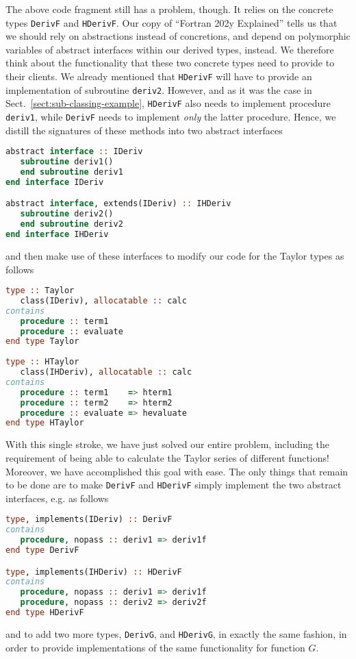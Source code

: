 \documentclass[11pt,oneside]{article}
\begin{document}
The above code fragment still has a problem, though. It relies on the
concrete types \texttt{DerivF} and \texttt{HDerivF}. Our copy of
``Fortran 202y Explained'' tells us that we should rely on
abstractions instead of concretions, and depend on polymorphic
variables of abstract interfaces within our derived types, instead. We
therefore think about the functionality that these two concrete types
need to provide to their clients. We already mentioned that
\texttt{HDerivF} will have to provide an implementation of subroutine
\texttt{deriv2}. However, and as it was the case in
Sect.~\ref{sect:sub-classing-example}, \texttt{HDerivF} also needs to
implement procedure \texttt{deriv1}, while \texttt{DerivF} needs to
implement \emph{only} the latter procedure. Hence, we distill the
signatures of these methods into two abstract interfaces
\begin{lstlisting}[language=Fortran]
abstract interface :: IDeriv
   subroutine deriv1()
   end subroutine deriv1
end interface IDeriv

abstract interface, extends(IDeriv) :: IHDeriv
   subroutine deriv2()
   end subroutine deriv2
end interface IHDeriv
\end{lstlisting}
and then make use of these interfaces to modify our code for the
Taylor types as follows
\begin{lstlisting}[language=Fortran]
type :: Taylor
   class(IDeriv), allocatable :: calc
contains
   procedure :: term1
   procedure :: evaluate
end type Taylor
   
type :: HTaylor
   class(IHDeriv), allocatable :: calc
contains
   procedure :: term1    => hterm1
   procedure :: term2    => hterm2
   procedure :: evaluate => hevaluate
end type HTaylor
\end{lstlisting}
With this single stroke, we have just solved our entire problem,
including the requirement of being able to calculate the Taylor series
of different functions! Moreover, we have accomplished this goal with
ease. The only things that remain to be done are to make
\texttt{DerivF} and \texttt{HDerivF} simply implement the two abstract
interfaces, e.g. as follows
\begin{lstlisting}[language=Fortran,
    caption={Implementation of interfaces for derivatives of function $F$.},
    label={listing:implderivf}]
type, implements(IDeriv) :: DerivF
contains
   procedure, nopass :: deriv1 => deriv1f
end type DerivF

type, implements(IHDeriv) :: HDerivF
contains
   procedure, nopass :: deriv1 => deriv1f
   procedure, nopass :: deriv2 => deriv2f
end type HDerivF
\end{lstlisting}
and to add two more types, \texttt{DerivG}, and \texttt{HDerivG}, in
exactly the same fashion, in order to provide implementations of the
same functionality for function $G$.
\end{document}
